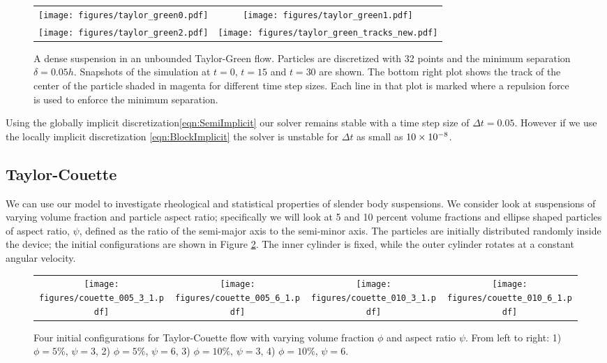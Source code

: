 \documentclass[preprint, 10pt]{elsarticle}
\begin{document}
\begin{figure}[!h]
\begin{center}
\begin{tabular}{c c }
\texttt{[image: figures/taylor\_green0.pdf]} &
\texttt{[image: figures/taylor\_green1.pdf]}\\
\texttt{[image: figures/taylor\_green2.pdf]} &
 \texttt{[image: figures/taylor\_green\_tracks\_new.pdf]}
\end{tabular}
\end{center}
\caption{A dense suspension in an unbounded Taylor-Green flow. Particles are
discretized with 32 points and the minimum separation $\delta=0.05h$.
Snapshots of the simulation at $t=0$, $t=15$ and $t=30$ are shown. The bottom
right plot shows the track of the center of the particle shaded in magenta for
different time step sizes. Each line in that plot is marked where a repulsion
force is used to enforce the minimum separation. }\label{fig:taylor_green}
\end{figure}

Using the globally implicit discretization\eqref{eqn:SemiImplicit} our solver remains stable with a
time step size of $\Delta t=0.05$. However if we use the locally implicit discretization
\eqref{eqn:BlockImplicit} the solver is unstable for $\Delta t$ as small as $10\times 10^{-8}$.

\FloatBarrier
\subsection{Taylor-Couette}

We can use our model to investigate rheological and statistical properties of
slender body suspensions. We consider look at suspensions of varying volume
fraction and particle aspect ratio; specifically we will look at 5 and 10
percent volume fractions and ellipse shaped particles of aspect ratio, $\psi$, defined as the ratio
of the semi-major axis to the semi-minor axis. The particles are initially distributed randomly
inside the device; the
initial configurations are shown in Figure \ref{fig:couette_setup}. The inner
cylinder is fixed, while the outer cylinder rotates at a constant angular
velocity.

\begin{figure}[!h]
\begin{center}
\begin{tabular}{c c c c}
\texttt{[image: figures/couette\_005\_3\_1.pdf]} &
\texttt{[image: figures/couette\_005\_6\_1.pdf]} &
\texttt{[image: figures/couette\_010\_3\_1.pdf]} &
\texttt{[image: figures/couette\_010\_6\_1.pdf]}
\end{tabular}
\end{center}
\caption{Four initial configurations for Taylor-Couette flow with varying volume fraction $\phi$ and
aspect ratio $\psi$. From left to right: 1) $\phi=5\%$, $\psi=
3$, 2) $\phi=5\%$, $\psi=6$, 3) $\phi=10\%$, $\psi=3$, 4) $\phi=10\%$,
$\psi=6$.}\label{fig:couette_setup}
\end{figure}
\end{document}
